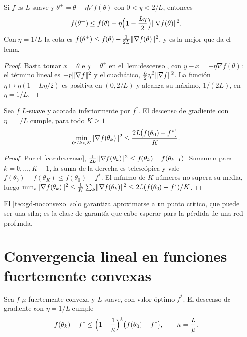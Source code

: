 \begin{corolario}\label{cor:descenso}
Si $f$ es $L$-suave y $\theta^{+}=\theta-\eta\nabla f(\theta)$ con $0<\eta<2/L$, entonces
\[
f(\theta^{+})\le f(\theta)-\eta\Bigl(1-\frac{L\eta}{2}\Bigr)\lVert\nabla f(\theta)\rVert^{2}.
\]
Con $\eta=1/L$ la cota es $f(\theta^{+})\le f(\theta)-\frac{1}{2L}\lVert\nabla f(\theta)\rVert^{2}$, y es la mejor que da el lema.
\end{corolario}

\begin{proof}
Basta tomar $x=\theta$ e $y=\theta^{+}$ en el \cref{lem:descenso}, con $y-x=-\eta\nabla f(\theta)$: el término lineal es $-\eta\lVert\nabla f\rVert^{2}$ y el cuadrático, $\frac{L}{2}\eta^{2}\lVert\nabla f\rVert^{2}$. La función $\eta\mapsto\eta(1-L\eta/2)$ es positiva en $(0,2/L)$ y alcanza su máximo, $1/(2L)$, en $\eta=1/L$.
\end{proof}

\begin{teorema}\label{teo:gd-noconvexo}
Sea $f$ $L$-suave y acotada inferiormente por $f^{\ast}$. El descenso de gradiente con $\eta=1/L$ cumple, para todo $K\ge 1$,
\[
\min_{0\le k<K}\lVert\nabla f(\theta_k)\rVert^{2}\le\frac{2L\bigl(f(\theta_0)-f^{\ast}\bigr)}{K}.
\]
\end{teorema}

\begin{proof}
Por el \cref{cor:descenso}, $\frac{1}{2L}\lVert\nabla f(\theta_k)\rVert^{2}\le f(\theta_k)-f(\theta_{k+1})$. Sumando para $k=0,\dots,K-1$, la suma de la derecha es telescópica y vale $f(\theta_0)-f(\theta_K)\le f(\theta_0)-f^{\ast}$. El mínimo de $K$ números no supera su media, luego $\min_k\lVert\nabla f(\theta_k)\rVert^{2}\le\frac1K\sum_k\lVert\nabla f(\theta_k)\rVert^{2}\le 2L(f(\theta_0)-f^{\ast})/K$.
\end{proof}

El \cref{teo:gd-noconvexo} solo garantiza aproximarse a un punto crítico, que puede ser una silla; es la clase de garantía que cabe esperar para la pérdida de una red profunda.

\section{Convergencia lineal en funciones fuertemente convexas}

\begin{teorema}\label{teo:gd-fuerte}
Sea $f$ $\mu$-fuertemente convexa y $L$-suave, con valor óptimo $f^{\ast}$. El descenso de gradiente con $\eta=1/L$ cumple
\[
f(\theta_k)-f^{\ast}\le\Bigl(1-\frac{1}{\kappa}\Bigr)^{k}\bigl(f(\theta_0)-f^{\ast}\bigr),\qquad\kappa=\frac{L}{\mu}.
\]
\end{teorema}

